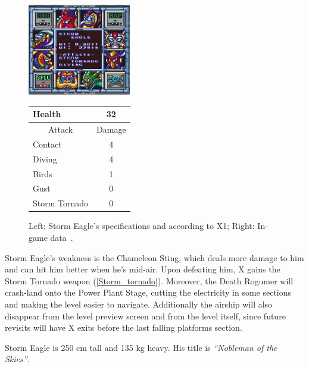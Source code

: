 \begin{figure}[htp]
	\begin{minipage}[c]{0.45\linewidth}
		\vspace{0pt}
		\centering
		\includegraphics[height=4cm]{figures/X1/Storm_eagle/Storm_eagle_specs.png}
	\end{minipage}
	\begin{minipage}[c]{0.45\linewidth}
		\centering
		\vspace{0pt}
		\begin{tabular}[h]{l c}
			\toprule
			Health  & 32\\
			\midrule
			\multicolumn{1}{c}{Attack} & \multicolumn{1}{c}{Damage}\\
			Contact & 4\\
			Diving & 4\\
			Birds & 1\\
			Gust & 0\\
			Storm Tornado & 0\\
			\bottomrule
		\end{tabular}
	\end{minipage}
	\caption{Left: Storm Eagle's specifications and according to X1; Right: In-game data~\cite{wiki:Storm_eagle,book:Compendium}. }
	\label{Eagle_specs}
\end{figure}
Storm Eagle's weakness is the Chameleon Sting, which deals more damage to him and can hit him better when he's mid-air. Upon defeating him, X gains the Storm Tornado weapon (\ref{Storm_tornado}). Moreover, the Death Rogumer will crash-land onto the Power Plant Stage, cutting the electricity in some sections and making the level easier to navigate. Additionally the airship will also disappear from the level preview screen and from the level itself, since future revisits will have X exits before the last falling platforms section.

Storm Eagle is 250 cm tall and 135 kg heavy. His title is \textit{``Nobleman of the Skies''}. 


